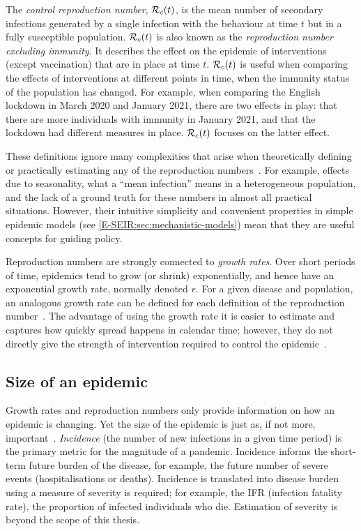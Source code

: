 \documentclass[thesis.tex]{subfiles}
\begin{document}
The \emph{control reproduction number}, $\mathcal{R}_{c}(t)$, is the mean number of secondary infections generated by a single infection with the behaviour at time $t$ but in a fully susceptible population.
$\mathcal{R}_{c}(t)$ is also known as the \emph{reproduction number excluding immunity}.
It describes the effect on the epidemic of interventions (except vaccination) that are in place at time $t$.
$\mathcal{R}_{c}(t)$ is useful when comparing the effects of interventions at different points in time, when the immunity status of the population has changed.
For example, when comparing the English lockdown in March 2020 and January 2021, there are two effects in play: that there are more individuals with immunity in January 2021, and that the lockdown had different measures in place.
$\mathcal{R}_{c}(t)$ focuses on the latter effect.

These definitions ignore many complexities that arise when theoretically defining or practically estimating any of the reproduction numbers~\autocite{pellisEstimation}.
For example, effects due to seasonality, what a ``mean infection'' means in a heterogeneous population, and the lack of a ground truth for these numbers in almost all practical situations.
However, their intuitive simplicity and convenient properties in simple epidemic models (see \cref{E-SEIR:sec:mechanistic-models}) mean that they are useful concepts for guiding policy.

Reproduction numbers are strongly connected to \emph{growth rates}.
Over short periods of time, epidemics tend to grow (or shrink) exponentially, and hence have an exponential growth rate, normally denoted $r$.
For a given disease and population, an analogous growth rate can be defined for each definition of the reproduction number~\autocite{pellisEstimation,paragGrowthRates,wallingaGI}.
The advantage of using the growth rate it is easier to estimate and captures how quickly spread happens in calendar time; however, they do not directly give the strength of intervention required to control the epidemic~\autocite{royalSocietyRnumber}.

\subsection{Size of an epidemic}

Growth rates and reproduction numbers only provide information on how an epidemic is changing.
Yet the size of the epidemic is just as, if not more, important~\autocite{pellisEstimation}.
\emph{Incidence} (the number of new infections in a given time period) is the primary metric for the magnitude of a pandemic.
Incidence informs the short-term future burden of the disease, for example, the future number of severe events (hospitalisations or deaths).
Incidence is translated into disease burden using a measure of severity is required; for example, the IFR (infection fatality rate), the proportion of infected individuals who die.
Estimation of severity is beyond the scope of this thesis.
\end{document}
